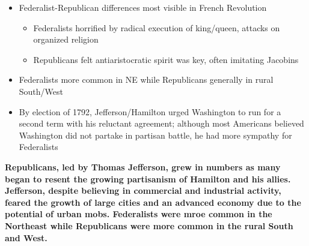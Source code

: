 \documentclass[a4paper]{article}
\begin{document}
{\begin{itemize}
\begin{itemize}
\begin{itemize}
                \item Sought decentralized society with smaller property owners
            \end{itemize} 
        \end{itemize}
        \item Federalist-Republican differences most visible in French Revolution
        \begin{itemize}
            \item Federalists horrified by radical execution of king/queen, attacks on organized religion
            \item Republicans felt antiaristocratic spirit was key, often imitating Jacobins
        \end{itemize}
        \item Federalists more common in NE while Republicans generally in rural South/West
        \item By election of 1792, Jefferson/Hamilton urged Washington to run for a second term with his reluctant agreement; although most Americans believed Washington did not partake in partisan battle, he had more sympathy for Federalists
    \end{itemize}
    \textbf{Republicans, led by Thomas Jefferson, grew in numbers as many began to resent the growing partisanism of Hamilton and his allies. Jefferson, despite believing in commercial and industrial activity, feared the growth of large cities and an advanced economy due to the potential of urban mobs. Federalists were mroe common in the Northeast while Republicans were more common in the rural South and West.}}
    
\end{document}

